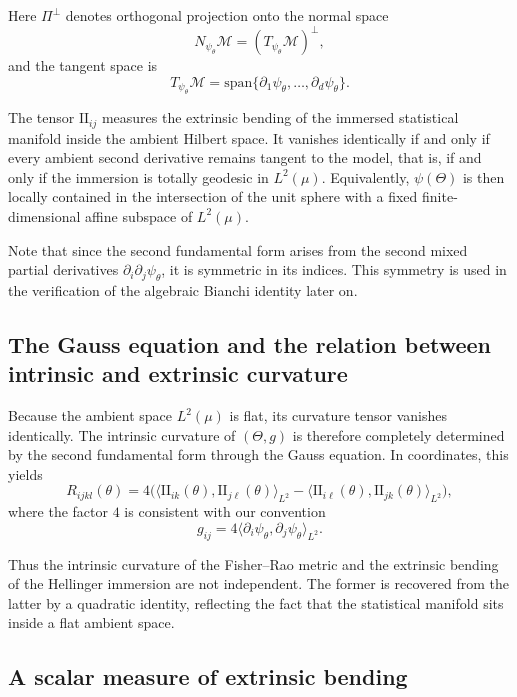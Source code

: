 \documentclass[11pt,letterpaper]{amsart}
\numberwithin{equation}{section}
\theoremstyle{plain}
\theoremstyle{definition}
\theoremstyle{remark}
\begin{document}
Here \(\Pi^\perp\) denotes orthogonal projection onto the normal space
\[
N_{\psi_\theta}\mathcal M=(T_{\psi_\theta}\mathcal M)^\perp,
\]
and the tangent space is
\[
T_{\psi_\theta}\mathcal M
=
\mathrm{span}\{\partial_1\psi_\theta,\dots,\partial_d\psi_\theta\}.
\]

The tensor \(\mathrm{II}_{ij}\) measures the extrinsic bending of the immersed statistical manifold inside the ambient Hilbert space. It vanishes identically if and only if every ambient second derivative remains tangent to the model, that is, if and only if the immersion is totally geodesic in \(L^2(\mu)\). Equivalently, \(\psi(\Theta)\) is then locally contained in the intersection of the unit sphere with a fixed finite-dimensional affine subspace of \(L^2(\mu)\).

Note that since the second fundamental form arises from the second mixed partial derivatives \(\partial_i\partial_j\psi_\theta\), it is symmetric in its indices. This symmetry is used in the verification of the algebraic Bianchi identity later on.

\subsection{The Gauss equation and the relation between intrinsic and extrinsic curvature}

Because the ambient space \(L^2(\mu)\) is flat, its curvature tensor vanishes identically. The intrinsic curvature of \((\Theta,g)\) is therefore completely determined by the second fundamental form through the Gauss equation. In coordinates, this yields
\begin{equation*}
R_{ijkl}(\theta)
=
4\Big(
\langle \mathrm{II}_{ik}(\theta),\mathrm{II}_{j\ell}(\theta)\rangle_{L^2}
-
\langle \mathrm{II}_{i\ell}(\theta),\mathrm{II}_{jk}(\theta)\rangle_{L^2}
\Big),
\end{equation*}
where the factor \(4\) is consistent with our convention
\[
g_{ij}=4\langle \partial_i\psi_\theta,\partial_j\psi_\theta\rangle_{L^2}.
\]

Thus the intrinsic curvature of the Fisher--Rao metric and the extrinsic bending of the Hellinger immersion are not independent. The former is recovered from the latter by a quadratic identity, reflecting the fact that the statistical manifold sits inside a flat ambient space.

\subsection{A scalar measure of extrinsic bending}
\end{document}
